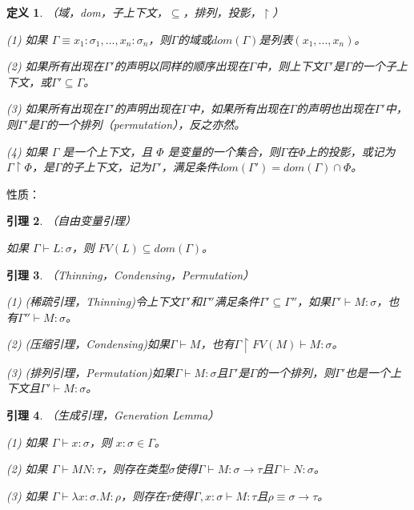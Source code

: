 \documentclass[UTF8]{article}
\newtheorem{thm}{定义}[section]
\newtheorem{lemma}[thm]{引理}
\begin{document}
		\begin{thm} （域，dom，子上下文，$\subseteq$，排列，投影，$\upharpoonright$）
			
			(1) 如果 $\Gamma\equiv x_1:\sigma_1,...,x_n:\sigma_n$，则$\Gamma$的域或$dom(\Gamma)$是列表$(x_1,...,x_n)$。
			
			(2) 如果所有出现在$\Gamma'$的声明以同样的顺序出现在$\Gamma$中，则上下文$\Gamma'$是$\Gamma$的一个子上下文，或$\Gamma'\subseteq\Gamma$。
			
			(3) 如果所有出现在$\Gamma'$的声明出现在$\Gamma$中，如果所有出现在$\Gamma$的声明也出现在$\Gamma'$中，则$\Gamma'$是$\Gamma$的一个排列（permutation），反之亦然。
			
			(4) 如果 $\Gamma$ 是一个上下文，且 $\Phi$ 是变量的一个集合，则$\Gamma$在$\Phi$上的投影，或记为$\Gamma\upharpoonright\Phi$，是$\Gamma$的子上下文，记为$\Gamma'$，满足条件$dom(\Gamma') = dom(\Gamma)\cap\Phi$。
		\end{thm}
	
		性质：
		
		\begin{lemma} （自由变量引理）
			
			如果 $\Gamma\vdash L:\sigma$，则 $FV(L)\subseteq dom(\Gamma)$。
		\end{lemma}
	
		\begin{lemma} （Thinning，Condensing，Permutation）
			
			(1) (稀疏引理，Thinning)令上下文$\Gamma'$和$\Gamma''$满足条件$\Gamma'\subseteq\Gamma''$，如果$\Gamma'\vdash M:\sigma$，也有$\Gamma''\vdash M:\sigma$。
			
			(2) (压缩引理，Condensing)如果$\Gamma\vdash M$，也有$\Gamma\upharpoonright FV(M) \vdash M:\sigma$。
			
			(3) (排列引理，Permutation)如果$\Gamma\vdash M:\sigma$且$\Gamma'$是$\Gamma$的一个排列，则$\Gamma'$也是一个上下文且$\Gamma'\vdash M:\sigma$。
		\end{lemma}
	
		\begin{lemma} （生成引理，Generation Lemma）
			
			(1) 如果 $\Gamma\vdash x:\sigma$，则 $x:\sigma \in\Gamma$。
			
			(2) 如果 $\Gamma\vdash M N:\tau$，则存在类型$\sigma$使得$\Gamma\vdash M:\sigma \rightarrow \tau$且$\Gamma\vdash N:\sigma$。
			
			(3) 如果 $\Gamma\vdash\lambda x:\sigma.M:\rho$，则存在$\tau$使得$\Gamma,x:\sigma\vdash M:\tau$且$\rho\equiv\sigma\rightarrow\tau$。
		\end{lemma}
	
\end{document}
